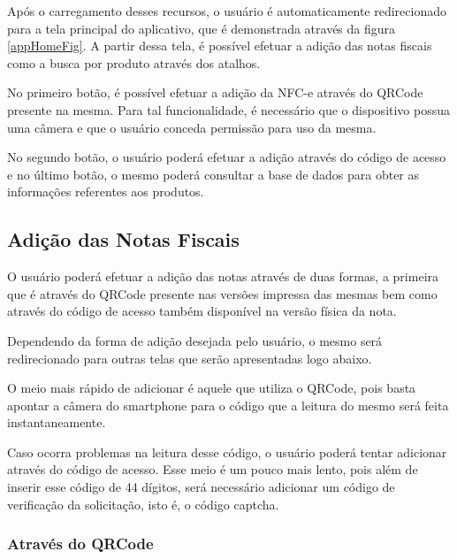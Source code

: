 Após o carregamento desses recursos, o usuário é automaticamente redirecionado para a tela principal do aplicativo, que é demonstrada através da figura \ref{appHomeFig}. A partir dessa tela, é possível efetuar a adição das notas fiscais como a busca por produto através dos atalhos.

No primeiro botão, é possível efetuar a adição da NFC-e através do QRCode presente na mesma. Para tal funcionalidade, é necessário que o dispositivo possua uma câmera e que o usuário conceda permissão para uso da mesma.

No segundo botão, o usuário poderá efetuar a adição através do código de acesso e no último botão, o mesmo poderá consultar a base de dados para obter as informações referentes aos produtos.

\subsection{Adição das Notas Fiscais}

O usuário poderá efetuar a adição das notas através de duas formas, a primeira que é através do QRCode presente nas versões impressa das mesmas bem como através do código de acesso também disponível na versão física da nota.

Dependendo da forma de adição desejada pelo usuário, o mesmo será redirecionado para outras telas que serão apresentadas logo abaixo.

O meio mais rápido de adicionar é aquele que utiliza o QRCode, pois basta apontar a câmera do smartphone para o código que a leitura do mesmo será feita instantaneamente.

Caso ocorra problemas na leitura desse código, o usuário poderá tentar adicionar através do código de acesso. Esse meio é um pouco mais lento, pois além de inserir esse código de 44 dígitos, será necessário adicionar um código de verificação da solicitação, isto é, o código captcha.

\subsubsection{Através do QRCode}

